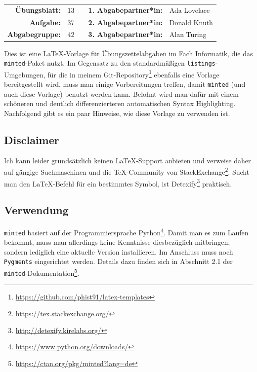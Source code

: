 
\newcommand{\obenlinks}{Übungen zur Vorlesung Informatik I}   %



\begin{center} %
  \begin{tabular}{|rlp{4cm}rl|}
    \hline
    \textbf{Übungsblatt:} & 13 &  & \textbf{1. Abgabepartner*in:} & Ada Lovelace \\
    \textbf{Aufgabe:} & 37 &  & \textbf{2. Abgabepartner*in:} & Donald Knuth \\
    \textbf{Abgabegruppe:} & 42 &  & \textbf{3. Abgabepartner*in:} & Alan Turing  \\ \hline
  \end{tabular}
\end{center} 

Dies ist eine \LaTeX-Vorlage für Übungszettelabgaben im Fach Informatik, die das \texttt{minted}-Paket nutzt.
Im Gegensatz zu den standardmäßigen \texttt{listings}-Umgebungen, für die in meinem Git-Repository\footnote{\url{https://github.com/phist91/latex-templates}} ebenfalls eine Vorlage bereitgestellt wird, muss man einige Vorbereitungen treffen, damit \texttt{minted} (und auch diese Vorlage) benutzt werden kann.
Belohnt wird man dafür mit einem schöneren und deutlich differenzierteren automatischen Syntax Highlighting.
Nachfolgend gibt es ein paar Hinweise, wie diese Vorlage zu verwenden ist.

\subsection*{Disclaimer}
Ich kann leider grundsätzlich keinen \LaTeX-Support anbieten und verweise daher auf gängige Suchmaschinen und die \TeX-Community von StackExchange\footnote{\url{https://tex.stackexchange.org/}}.    
Sucht man den LaTeX-Befehl für ein bestimmtes Symbol, ist Detexify\footnote{\url{http://detexify.kirelabs.org/}} praktisch.

\subsection*{Verwendung}
\texttt{minted} basiert auf der Programmiersprache Python\footnote{\url{https://www.python.org/downloads/}}.
Damit man es zum Laufen bekommt, muss man allerdings keine Kenntnisse diesbezüglich mitbringen, sondern lediglich eine aktuelle Version installieren.
Im Anschluss muss noch \texttt{Pygments} eingerichtet werden.
Details dazu finden sich in Abschnitt 2.1 der \texttt{minted}-Dokumentation\footnote{\url{https://ctan.org/pkg/minted?lang=de}}.

